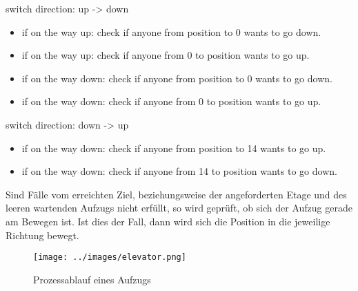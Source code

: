 \documentclass[envcountsame, envcountchap, deutsch]{i-studis}
\providecommand{\tightlist}{%
  \setlength{\itemsep}{0pt}\setlength{\parskip}{0pt}}
\begin{document}
switch direction: up -\textgreater{} down

\begin{itemize}
\item
  if on the way up: check if anyone from position to 0 wants to go down.
\item
  if on the way up: check if anyone from 0 to position wants to go up.
\item
  if on the way down: check if anyone from position to 0 wants to go
  down.
\item
  if on the way down: check if anyone from 0 to position wants to go up.
\end{itemize}

switch direction: down -\textgreater{} up

\begin{itemize}
\tightlist
\item
  if on the way down: check if anyone from position to 14 wants to go
  up.
\item
  if on the way down: check if anyone from 14 to position wants to go
  down.
\end{itemize}

Sind Fälle vom erreichten Ziel, beziehungsweise der angeforderten Etage
und des leeren wartenden Aufzugs nicht erfüllt, so wird geprüft, ob sich
der Aufzug gerade am Bewegen ist. Ist dies der Fall, dann wird sich die
Position in die jeweilige Richtung bewegt.

\begin{figure}
\centering
\texttt{[image: ../images/elevator.png]}
\caption{Prozessablauf eines Aufzugs}
\end{figure}




\end{document}
